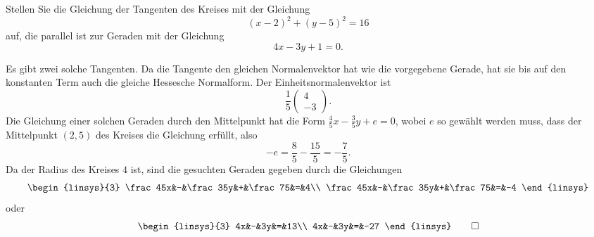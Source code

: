 Stellen Sie die Gleichung der Tangenten des Kreises mit der Gleichung
\[
(x-2)^2+(y-5)^2=16
\]
auf, die parallel ist zur Geraden mit der Gleichung
\[
4x-3y+1=0.
\]

\begin{loesung}
Es gibt zwei solche Tangenten. Da die Tangente den gleichen Normalenvektor
hat wie die vorgegebene Gerade, hat sie bis auf den konstanten Term
auch die gleiche Hessesche Normalform. Der Einheitsnormalenvektor
ist
\[
\frac15\begin{pmatrix}4\\-3\end{pmatrix}.
\]
Die Gleichung einer solchen Geraden durch den Mittelpunkt hat
die Form $\frac45x-\frac35y+e=0$, wobei $e$ so gewählt werden
muss, dass der Mittelpunkt $(2,5)$ des Kreises die Gleichung
erfüllt, also
\[
-e=\frac85-\frac{15}5=-\frac75.
\]
Da der Radius des Kreises $4$ ist, sind die gesuchten Geraden gegeben
durch die Gleichungen
\[
\begin{linsys}{3}
\frac45x&-&\frac35y&+&\frac75&=&4\\
\frac45x&-&\frac35y&+&\frac75&=&-4
\end{linsys}
\]
oder
\[
\begin{linsys}{3}
4x&-&3y&=&13\\
4x&-&3y&=&-27
\end{linsys}
\qedhere
\]
\end{loesung}
